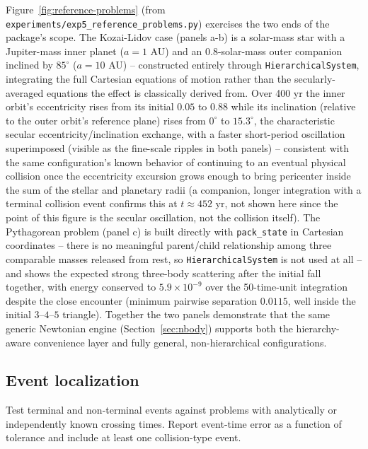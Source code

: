 \documentclass[11pt]{article}
\begin{document}
Figure~\ref{fig:reference-problems} (from
\texttt{experiments/exp5\_reference\_problems.py}) exercises the
two ends of the package's scope. The Kozai-Lidov case (panels a-b) is a
solar-mass star with a Jupiter-mass inner planet ($a=1$ AU) and an
0.8-solar-mass outer companion inclined by $85^\circ$ ($a=10$ AU) --
constructed entirely through \texttt{HierarchicalSystem}, integrating the
full Cartesian equations of motion rather than the secularly-averaged
equations the effect is classically derived from. Over 400 yr the inner
orbit's eccentricity rises from its initial $0.05$ to $0.88$ while its
inclination (relative to the outer orbit's reference plane) rises from
$0^\circ$ to $15.3^\circ$, the characteristic secular eccentricity/inclination
exchange, with a faster short-period oscillation superimposed (visible as
the fine-scale ripples in both panels) -- consistent with the same
configuration's known behavior of continuing to an eventual physical
collision once the eccentricity excursion grows enough to bring pericenter
inside the sum of the stellar and planetary radii (a companion, longer
integration with a terminal collision event confirms this at $t\approx452$
yr, not shown here since the point of this figure is the secular oscillation,
not the collision itself). The Pythagorean problem (panel c) is built
directly with \texttt{pack\_state} in Cartesian coordinates -- there is no
meaningful parent/child relationship among three comparable masses released
from rest, so \texttt{HierarchicalSystem} is not used at all -- and shows
the expected strong three-body scattering after the initial fall together,
with energy conserved to $5.9\times10^{-9}$ over the 50-time-unit
integration despite the close encounter (minimum pairwise separation
$0.0115$, well inside the initial $3$--$4$--$5$ triangle). Together the two
panels demonstrate that the same generic Newtonian engine
(Section~\ref{sec:nbody}) supports both the hierarchy-aware convenience
layer and fully general, non-hierarchical configurations.


\subsection{Event localization}

Test terminal and non-terminal events against problems with analytically or
independently known crossing times. Report event-time error as a function of
tolerance and include at least one collision-type event.
\end{document}
